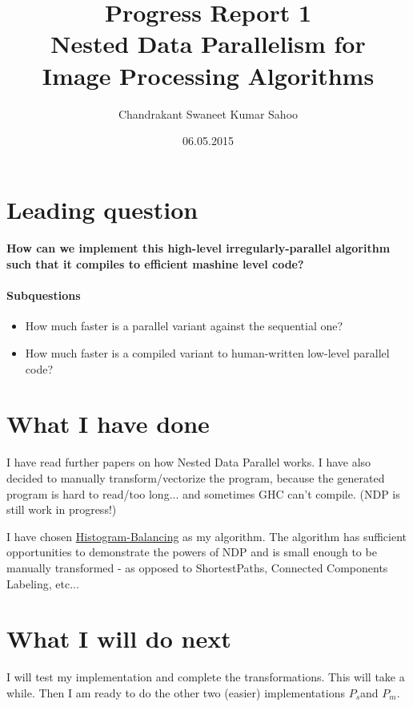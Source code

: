 \documentclass{article}
\title{
    Progress Report 1 \\[7pt]
    \large Nested Data Parallelism for\\ Image Processing Algorithms
}
\date{06.05.2015}
\author{Chandrakant Swaneet Kumar Sahoo}
\newcommand{\seq}[0]{$P_{s}$}
\renewcommand{\mp}[0]{$P_{m}$}
\newcommand{\note}[1]{{\tiny (#1)}}
\begin{document}
  
  \maketitle
  
  
  \section{Leading question}
  \paragraph{How can we implement this high-level irregularly-parallel algorithm such that it compiles to efficient mashine level code?}
  \paragraph{Subquestions}
      \begin{itemize}
      \item How much faster is a parallel variant against the sequential one?
      \item How much faster is a compiled variant to human-written low-level parallel code?
      \end{itemize}
  
  
  \section{What I have done}
    I have read further papers on how Nested Data Parallel works.
    I have also decided to manually transform/vectorize the program, because
    the generated program is hard to read/too long... and sometimes GHC can't compile.
    \note{NDP is still work in progress!}
    
    I have chosen \href{http://en.wikipedia.org/wiki/Histogram_equalization#Full-sized_image}{Histogram-Balancing} as my algorithm.
    The algorithm has sufficient opportunities to demonstrate the powers of NDP and
    is small enough to be manually transformed - as opposed to ShortestPaths, Connected Components Labeling, etc...
    
  \section{What I will do next}
    I will test my implementation and complete the transformations.
    This will take a while. Then I am ready to do the other two (easier) implementations \seq  and \mp.
\end{document}
